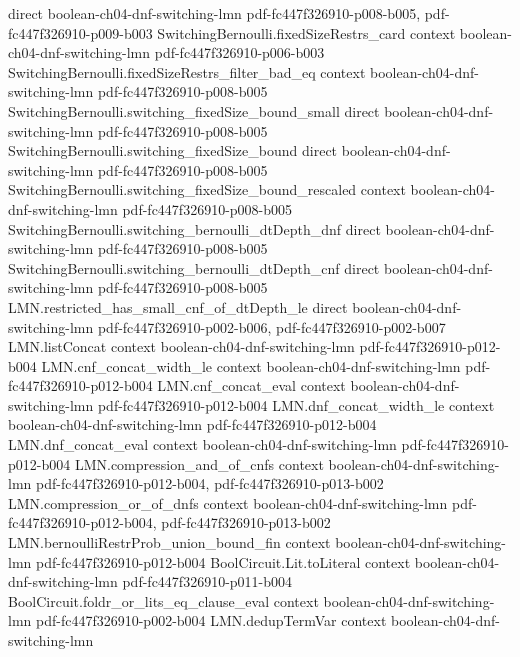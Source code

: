 \begin{theorem}
  {direct}
  {boolean-ch04-dnf-switching-lmn}
  {pdf-fc447f326910-p008-b005,
    pdf-fc447f326910-p009-b003}
\proofstep
  {SwitchingBernoulli.fixedSizeRestrs_card}
  {context}
  {boolean-ch04-dnf-switching-lmn}
  {pdf-fc447f326910-p006-b003}
\proofstep
  {SwitchingBernoulli.fixedSizeRestrs_filter_bad_eq}
  {context}
  {boolean-ch04-dnf-switching-lmn}
  {pdf-fc447f326910-p008-b005}
\proofstep
  {SwitchingBernoulli.switching_fixedSize_bound_small}
  {direct}
  {boolean-ch04-dnf-switching-lmn}
  {pdf-fc447f326910-p008-b005}
\proofstep
  {SwitchingBernoulli.switching_fixedSize_bound}
  {direct}
  {boolean-ch04-dnf-switching-lmn}
  {pdf-fc447f326910-p008-b005}
\proofstep
  {SwitchingBernoulli.switching_fixedSize_bound_rescaled}
  {context}
  {boolean-ch04-dnf-switching-lmn}
  {pdf-fc447f326910-p008-b005}
\proofstep
  {SwitchingBernoulli.switching_bernoulli_dtDepth_dnf}
  {direct}
  {boolean-ch04-dnf-switching-lmn}
  {pdf-fc447f326910-p008-b005}
\proofstep
  {SwitchingBernoulli.switching_bernoulli_dtDepth_cnf}
  {direct}
  {boolean-ch04-dnf-switching-lmn}
  {pdf-fc447f326910-p008-b005}
\proofstep
  {LMN.restricted_has_small_cnf_of_dtDepth_le}
  {direct}
  {boolean-ch04-dnf-switching-lmn}
  {pdf-fc447f326910-p002-b006,
    pdf-fc447f326910-p002-b007}
\proofstep
  {LMN.listConcat}
  {context}
  {boolean-ch04-dnf-switching-lmn}
  {pdf-fc447f326910-p012-b004}
\proofstep
  {LMN.cnf_concat_width_le}
  {context}
  {boolean-ch04-dnf-switching-lmn}
  {pdf-fc447f326910-p012-b004}
\proofstep
  {LMN.cnf_concat_eval}
  {context}
  {boolean-ch04-dnf-switching-lmn}
  {pdf-fc447f326910-p012-b004}
\proofstep
  {LMN.dnf_concat_width_le}
  {context}
  {boolean-ch04-dnf-switching-lmn}
  {pdf-fc447f326910-p012-b004}
\proofstep
  {LMN.dnf_concat_eval}
  {context}
  {boolean-ch04-dnf-switching-lmn}
  {pdf-fc447f326910-p012-b004}
\proofstep
  {LMN.compression_and_of_cnfs}
  {context}
  {boolean-ch04-dnf-switching-lmn}
  {pdf-fc447f326910-p012-b004,
    pdf-fc447f326910-p013-b002}
\proofstep
  {LMN.compression_or_of_dnfs}
  {context}
  {boolean-ch04-dnf-switching-lmn}
  {pdf-fc447f326910-p012-b004,
    pdf-fc447f326910-p013-b002}
\proofstep
  {LMN.bernoulliRestrProb_union_bound_fin}
  {context}
  {boolean-ch04-dnf-switching-lmn}
  {pdf-fc447f326910-p012-b004}
\proofstep
  {BoolCircuit.Lit.toLiteral}
  {context}
  {boolean-ch04-dnf-switching-lmn}
  {pdf-fc447f326910-p011-b004}
\proofstep
  {BoolCircuit.foldr_or_lits_eq_clause_eval}
  {context}
  {boolean-ch04-dnf-switching-lmn}
  {pdf-fc447f326910-p002-b004}
\proofstep
  {LMN.dedupTermVar}
  {context}
  {boolean-ch04-dnf-switching-lmn}

\end{theorem}

